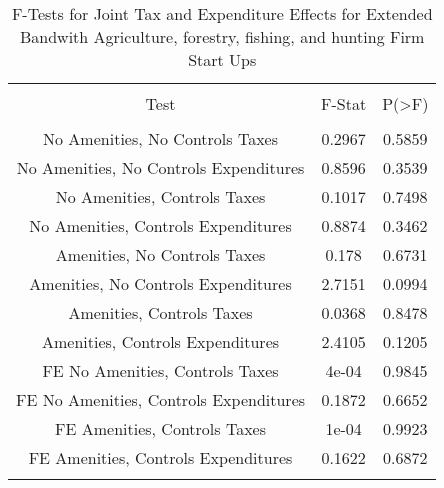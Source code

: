 
\begin{table}[!htbp] \centering 
  \caption{F-Tests for Joint Tax and Expenditure Effects for Extended Bandwith Agriculture, forestry, fishing, and hunting Firm Start Ups} 
  \label{11Ftests} 
\begin{tabular}{@{\extracolsep{5pt}} ccc} 
\\[-1.8ex]\hline 
\hline \\[-1.8ex] 
Test & F-Stat & P(\textgreater F) \\ 
\hline \\[-1.8ex] 
No Amenities, No Controls Taxes & 0.2967 & 0.5859 \\ 
No Amenities, No Controls Expenditures & 0.8596 & 0.3539 \\ 
No Amenities, Controls Taxes & 0.1017 & 0.7498 \\ 
No Amenities, Controls Expenditures & 0.8874 & 0.3462 \\ 
Amenities, No Controls Taxes & 0.178 & 0.6731 \\ 
Amenities, No Controls Expenditures & 2.7151 & 0.0994 \\ 
Amenities, Controls Taxes & 0.0368 & 0.8478 \\ 
Amenities, Controls Expenditures & 2.4105 & 0.1205 \\ 
FE No Amenities, Controls Taxes & 4e-04 & 0.9845 \\ 
FE No Amenities, Controls Expenditures & 0.1872 & 0.6652 \\ 
FE Amenities, Controls Taxes & 1e-04 & 0.9923 \\ 
FE Amenities, Controls Expenditures & 0.1622 & 0.6872 \\ 
\hline \\[-1.8ex] 
\end{tabular} 
\end{table} 
